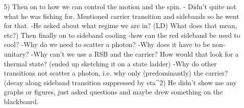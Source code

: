 \documentclass{article}%
\begin{document}
\begin{enumerate}
\begin{mycolorbox}
 5) Then on to how we can control the motion and the spin.\newline%
 {-} Didn't quite not what he was fishing for. Mentioned carrier transition and sidebands so he went for that.\newline%
 {-}He asked about what regime we are in? (LD) What does that mean, etc?) Then finally on to sideband cooling\newline%
 {-}how can the red sideband be used to cool?\newline%
 {-}Why do we need to scatter a photon?\newline%
 {-}Why does it have to be non{-}unitary?\newline%
 {-}Why can't we use a RSB and the carrier? How would that look for a thermal state? (ended up sketching it on a state ladder)\newline%
 {-}Why do other transitions not scatter a photon, i.e. why only (predominantly) the carrier? (decay along sideband transition suppressed by eta\^{}2)\newline%
 He didn't show me any graphs or figures, just asked questions and maybe drew something on the blackboard.%
\end{mycolorbox}%
\end{enumerate}%
\newpage%
\end{document}
